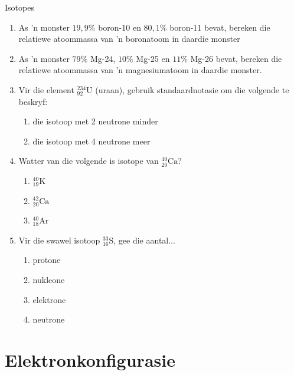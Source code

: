 \begin{exercises}{Isotopes}
{\begin{enumerate}[noitemsep, label=\textbf{\arabic*}. ]
\item As 'n monster $19,9\%$ boron-10 en $80,1\%$ boron-11 bevat, bereken die relatiewe atoommassa van 'n boronatoom in daardie monster  

\item As 'n monster $79\%$ Mg-24, $10\%$ Mg-25 en $11\%$ Mg-26 bevat, bereken die relatiewe atoommassa van 'n magnesiumatoom in daardie monster.

\item Vir die element $^{234}_{92}{\text{U}}$ (uraan), gebruik standaardnotasie om die volgende te beskryf:
\begin{enumerate}[noitemsep, label=\textbf{\alph*}. ]
\item die isotoop met 2 neutrone minder
\item die isotoop met 4 neutrone meer
\end{enumerate}

\item Watter van die volgende is isotope van $^{40}_{20}\text{Ca}$?
\begin{enumerate}[noitemsep, label=\textbf{\alph*}. ]
\item $^{40}_{19}\text{K}$
\item $^{42}_{20}\text{Ca}$
\item $^{40}_{18}\text{Ar}$
\end{enumerate}

\item Vir die swawel isotoop $^{33}_{16}\text{S}$, gee die aantal...
\begin{enumerate}[noitemsep, label=\textbf{\alph*}. ]
\item{protone}
\item{nukleone}
\item{elektrone}
\item{neutrone}
\end{enumerate}
\hspace{1ex}        
\end{enumerate}

}
\end{exercises}



\section{Elektronkonfigurasie}

